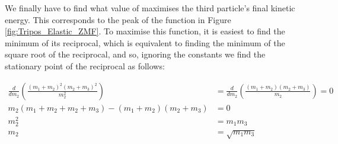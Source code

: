 \begin{problem}
{We finally have to find what value of  maximises the third particle's final kinetic energy. This corresponds to the peak of the function in Figure \ref{fig:Tripos_Elastic_ZMF}. To maximise this function, it is easiest to find the minimum of its reciprocal, which is equivalent to finding the minimum of the square root of the reciprocal, and so, ignoring the constants we find the stationary point of the reciprocal as follows:

\begin{eqnarray*}
\frac{d}{d m_2} \left( \frac{(m_{1}+m_{2})^{2} (m_{2}+m_{3})^{2}}{m_{2}^2}\right) &=\frac{d}{d m_2}\left(\frac{(m_{1}+m_{2})(m_{2}+m_{3})}{m_{2}}\right) =0 \\
m_2\left(m_1 + m_2 + m_2 +m_3\right)-\left(m_{1}+m_{2}\right)\left(m_{2}+m_{3}\right) &= 0 \\
m_2^2 &= m_1 m_3 \\
m_2 &= \sqrt{m_1 m_3}
\end{eqnarray*}

}
\end{problem}